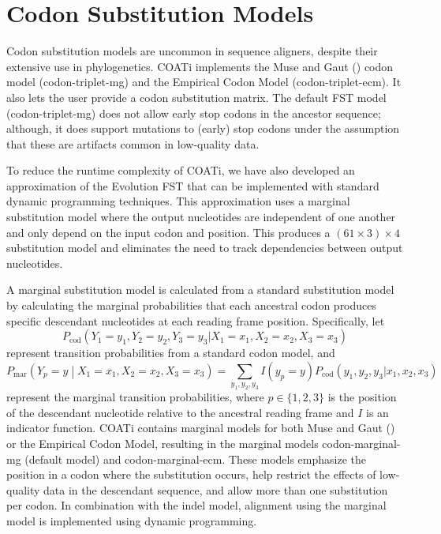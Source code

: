 \documentclass[12pt,letterpaper]{article}
\begin{document}
\section*{Codon Substitution Models}

Codon substitution models are uncommon in sequence aligners, despite their extensive use in phylogenetics.
COATi implements the Muse and Gaut (\citeyear{muse_gaut_1994}) codon model (codon-triplet-mg) and the Empirical Codon Model \citep{kosiol_ECM_2007} (codon-triplet-ecm).
It also lets the user provide a codon substitution matrix.
The default FST model (codon-triplet-mg) does not allow early stop codons in the ancestor sequence; although, it does support mutations to (early) stop codons under the assumption that these are artifacts common in low-quality data.

To reduce the runtime complexity of COATi, we have also developed an approximation of the Evolution FST that can be implemented with standard dynamic programming techniques. This approximation uses a marginal substitution model where the output nucleotides are independent of one another and only depend on the input codon and position. This produces a $\left(61 \times 3 \right) \times 4$ substitution model and eliminates the need to track dependencies between output nucleotides.

A marginal substitution model is calculated from a standard substitution model by calculating the marginal probabilities that each ancestral codon produces specific descendant nucleotides at each reading frame position.
%
Specifically, let
\[
P_\text{cod}\left( Y_1 = y_1, Y_2 = y_2, Y_3 = y_3 |
                   X_1 = x_1, X_2 = x_2, X_3 = x_3 \right)
\]
represent transition probabilities from a standard codon model, and
%
\[
P_\text{mar}\left(Y_p = y \middle| X_1 = x_1, X_2 = x_2, X_3 = x_3 \right)
=
\sum_{y_1, y_2, y_3} I(y_p = y)
P_\text{cod}\left( y_1, y_2, y_3 |
                   x_1, x_2, x_3 \right)
\]
%
represent the marginal transition probabilities, where
$p \in \{1, 2, 3\}$ is the position of the descendant nucleotide relative to the ancestral reading frame and $I$ is an indicator function.
COATi contains marginal models for both Muse and Gaut (\citeyear{muse_gaut_1994}) or the Empirical Codon Model, resulting in the marginal models codon-marginal-mg (default model) and codon-marginal-ecm.
These models emphasize the position in a codon where the substitution occurs, help restrict the effects of low-quality data in the descendant sequence, and allow more than one substitution per codon.
In combination with the indel model, alignment using the marginal model is implemented using dynamic programming.
\end{document}
